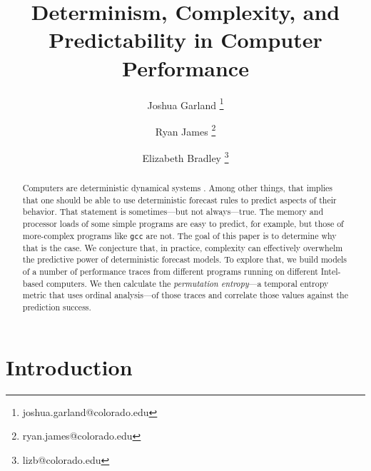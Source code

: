 \documentclass{article}
\title{Determinism, Complexity, and Predictability in Computer Performance}
\author[1]{Joshua Garland \thanks{joshua.garland@colorado.edu}}
\author[1]{Ryan James \thanks{ryan.james@colorado.edu}}
\author[1,2]{Elizabeth Bradley \thanks{lizb@colorado.edu}}
\affil[1]{Department of Computer Science\\
  University of Colorado at Boulder\\
  Colorado, USA
}
\affil[2]{Santa Fe Institute\\
  New Mexico, USA
}
\begin{document}
\maketitle





\begin{abstract}
  Computers are deterministic dynamical systems \cite{mytkowicz09}.
  Among other things, that implies that one should be able to use
  deterministic forecast rules to predict aspects of their behavior.
  That statement is sometimes---but not always---true. The memory and
  processor loads of some simple programs are easy to predict, for
  example, but those of more-complex programs like {\tt gcc} are not.
  The goal of this paper is to determine why that is the case. We
  conjecture that, in practice, complexity can effectively overwhelm
  the predictive power of deterministic forecast models. To explore
  that, we build models of a number of performance traces from
  different programs running on different Intel-based computers. We
  then calculate the \emph{permutation entropy}---a temporal entropy
  metric that uses ordinal analysis---of those traces and correlate
  those values against the prediction success.
\end{abstract}

\section{Introduction}
\end{document}
